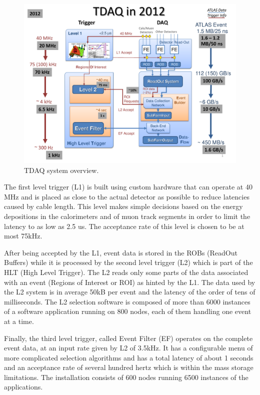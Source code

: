 \begin{figure}[ht!]
\centering
\includegraphics[scale=0.5]{Images/Trigger12.pdf}
\caption{TDAQ system overview.}
\end{figure}

The first level trigger (L1) is built using custom hardware that can operate at 40 MHz and is placed as close to the actual detector as possible to reduce latencies caused by cable length. This level makes simple decisions based on the energy depositions in the calorimeters and of muon track segments in order to limit the latency to as low as 2.5 us. The acceptance rate of this level is chosen to be at most 75kHz. 

After being accepted by the L1, event data is stored in the ROBs (ReadOut Buffers) while it is processed by the second level trigger (L2) which is part of the HLT (High Level Trigger). The L2 reads only some parts of the data associated with an event (Regions of Interest or ROI) as hinted by the L1. The data used by the L2 system is in average 50kB per event and the latency of the order of tens of milliseconds. The L2 selection software is composed of more than 6000 instances of a software application running on 800 nodes, each of them handling one event at a time. 

Finally, the third level trigger, called Event Filter (EF) operates on the complete event data, at an input rate given by L2 of 3.5kHz. It has a configurable menu of more complicated selection algorithms and has a total latency of about 1 seconds and an acceptance rate of several hundred hertz which is within the mass storage limitations. The installation consists of 600 nodes running 6500 instances of the applications.

